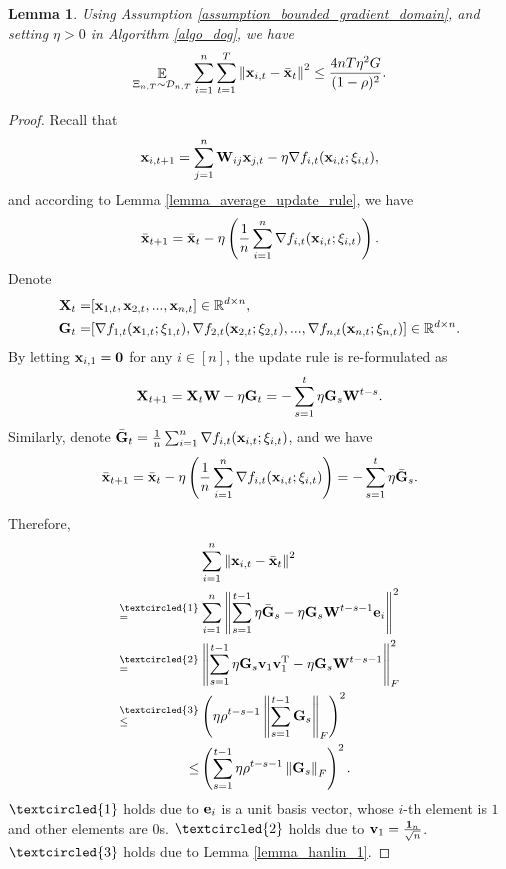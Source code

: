 \documentclass{article}
\newtheorem{Lemma}{\bf{Lemma}}
\begin{document}
\begin{Lemma}
\label{lemma_x_variance_norm_square}
Using Assumption \ref{assumption_bounded_gradient_domain}, and setting $\eta>0$ in Algorithm \ref{algo_dog}, we have 
\begin{align}
\nonumber
\mathop{\mathbb{E}}_{ \Xi_{n,T} \sim \mathcal{D}_{n,T} } \sum_{i=1}^n\sum_{t=1}^T \left\lVert{\bf x}_{i,t} - \bar{{\bf x}}_t\right\rVert^2 \le \frac{4nT\eta^2 G }{(1-\rho)^2}.
\end{align}

\end{Lemma}
\begin{proof}


Recall that 
\begin{align}
\nonumber
{\bf x}_{i,t+1} = \sum_{j=1}^n {\bf W}_{ij}{\bf x}_{j,t} - \eta \nabla f_{i,t}({\bf x}_{i,t};\xi_{i,t}), 
\end{align} and according to Lemma \ref{lemma_average_update_rule}, we have 
\begin{align}
\nonumber
\bar{{\bf x}}_{t+1} = \bar{{\bf x}}_t - \eta \left( \frac{1}{n}\sum_{i=1}^n \nabla f_{i,t}({\bf x}_{i,t};\xi_{i,t}) \right).
\end{align} Denote 
\begin{align}
\nonumber
{\bf X}_t = &  [{\bf x}_{1,t}, {\bf x}_{2,t}, ..., {\bf x}_{n,t}] \in \mathbb{R}^{d\times n}, \\ \nonumber
{\bf G}_t = & [\nabla f_{1,t}({\bf x}_{1,t};\xi_{1,t}), \nabla f_{2,t}({\bf x}_{2,t};\xi_{2,t}), ..., \nabla f_{n,t}({\bf x}_{n,t};\xi_{n,t})] \in \mathbb{R}^{d\times n}.
\end{align} By letting ${\bf x}_{i,1} = {\bf 0}$ for any $i\in[n]$, the update rule is re-formulated as 
\begin{align}
\nonumber
{\bf X}_{t+1} = {\bf X}_t {\bf W} - \eta {\bf G}_t = - \sum_{s=1}^t \eta {\bf G}_s {\bf W}^{t-s}. 
\end{align} Similarly, denote $\bar{{\bf G}}_t = \frac{1}{n}\sum_{i=1}^n \nabla f_{i,t}({\bf x}_{i,t};\xi_{i,t})$, and we have
\begin{align}
\bar{{\bf x}}_{t+1} = \bar{{\bf x}}_t - \eta \left( \frac{1}{n}\sum_{i=1}^n \nabla f_{i,t}({\bf x}_{i,t};\xi_{i,t}) \right) = - \sum_{s=1}^t \eta \bar{{\bf G}}_s. 
\end{align}


Therefore, 
\begin{align}
\nonumber
& \sum_{i=1}^n \lrnorm{\x_{i,t} - \bar{\x}_t}^2 \\ \nonumber
\refabovecir{=}{\textcircled{1}} & \sum_{i=1}^n \lrnorm{ \sum_{s=1}^{t-1} \eta \bar{\G}_s - \eta \G_s \W^{t-s-1}\e_i }^2   \\ \nonumber
\refabovecir{=}{\textcircled{2}} & \lrnorm{ \sum_{s=1}^{t-1} \eta \G_s\v_1 \v_1\Tr - \eta \G_s \W^{t-s-1} }^2_F   \\ \nonumber
\refabovecir{\le}{\textcircled{3}} & \lrincir{ \eta \rho^{t-s-1} \lrnorm{\sum_{s=1}^{t-1}\G_s}_F}^2 \\ \nonumber
\le & \lrincir{ \sum_{s=1}^{t-1} \eta \rho^{t-s-1} \lrnorm{\G_s}_F}^2.
\end{align} $\textcircled{1}$ holds due to ${\bf e}_i$ is a unit basis vector, whose $i$-th element is $1$ and other elements are $0$s. $\textcircled{2}$ holds due to ${\bf v}_1 = \frac{{\bf 1}_n}{\sqrt{n}}$. $\textcircled{3}$ holds due to Lemma \ref{lemma_hanlin_1}. 



\end{proof}
\end{document}
